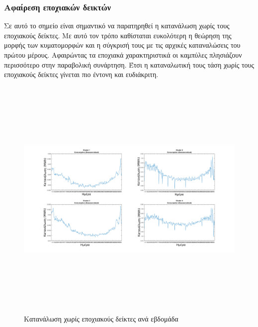 \subsubsection{Αφαίρεση εποχιακών δεικτών}
Σε αυτό το σημείο είναι σημαντικό να παρατηρηθεί η κατανάλωση χωρίς τους εποχιακούς δείκτες. Με αυτό τον τρόπο καθίσταται ευκολότερη η θεώρηση της μορφής των κυματομορφών και η σύγκρισή τους με τις αρχικές καταναλώσεις του πρώτου μέρους. Αφαιρώντας τα εποχιακά χαρακτηριστικά οι καμπύλες πλησιάζουν περισσότερο στην παραβολική συνάρτηση. Έτσι η καταναλωτική τους τάση χωρίς τους εποχιακούς δείκτες γίνεται πιο έντονη και ευδιάκριτη.
\begin{figure}[ht!]
\centering
\includegraphics[width=180mm, height=120mm]{../../plots/Trend_estimation/Deseasonalized_ALL.png}
\caption{Κατανάλωση χωρίς εποχιακούς δείκτες ανά εβδομάδα}
\label{fig:deseason week}
\end{figure}
\newpage

